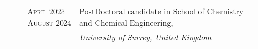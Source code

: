%
%





\begin{tabular}{rl}
    \textsc{April 2023 -- August 2024}            & PostDoctoral candidate in School of Chemistry and Chemical Engineering,\\
                                     &  \emph{University of Surrey, United Kingdom}  \\
\end{tabular}
